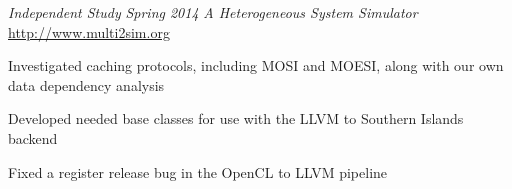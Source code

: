 \headerrow
{\emph{Independent Study}}
{\emph{Spring 2014}}
\headerrow
{\emph{A Heterogeneous System Simulator}}
{\url{http://www.multi2sim.org}}
\begin{itemize*}
    \item Investigated caching protocols, including MOSI and MOESI, along with
    our own data dependency analysis
    \item Developed needed base classes for use with the LLVM to Southern
    Islands backend
    \item Fixed a register release bug in the OpenCL to LLVM pipeline
\end{itemize*}
